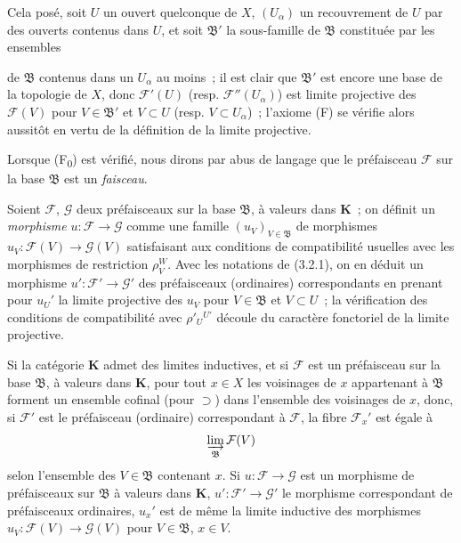 \begin{env}[3.2.2]
Cela posé, soit $U$ un ouvert quelconque de $X$, $(U_\alpha)$ un recouvrement
de $U$ par des ouverts contenus dans $U$, et soit $\mathfrak{B}'$ la
sous-famille de $\mathfrak{B}$ constituée par les ensembles


de $\mathfrak{B}$ contenus dans un $U_\alpha$ au moins~; il est clair que
$\mathfrak{B}'$ est encore une base de la topologie de $X$, donc
$\mathcal{F}'(U)$ (resp. $\mathcal{F}''(U_\alpha)$) est limite projective des
$\mathcal{F}(V)$ pour $V\in\mathfrak{B}'$ et $V\subset U$ (resp.
$V\subset U_\alpha$)~; l'axiome (F) se vérifie alors aussitôt en vertu de la
définition de la limite projective.

Lorsque (F\textsubscript{0}) est vérifié, nous dirons par abus de langage que
le préfaisceau $\mathcal{F}$ sur la base $\mathfrak{B}$ est un \emph{faisceau}.
\end{env}

\begin{env}[3.2.3]
\label{0.3.2.3-fr}
Soient $\mathcal{F}$, $\mathcal{G}$ deux préfaisceaux sur la base
$\mathfrak{B}$, à valeurs dans $\mathbf{K}$~; on définit un \emph{morphisme}
$u:\mathcal{F}\to\mathcal{G}$ comme une famille
$(u_V)_{V\in\mathfrak{B}}$ de morphismes
$u_V:\mathcal{F}(V)\to\mathcal{G}(V)$ satisfaisant aux conditions de
compatibilité usuelles avec les morphismes de restriction $\rho_V^W$. Avec
les notations de (3.2.1), on en déduit un morphisme
$u':\mathcal{F}'\to\mathcal{G}'$ des préfaisceaux (ordinaires) correspondants
en prenant pour $u_U'$ la limite projective des $u_V$ pour
$V\in\mathfrak{B}$ et $V\subset U$~; la vérification des conditions de
compatibilité avec $\rho'_U{}^{U'}$ découle du caractère fonctoriel de la
limite projective.
\end{env}

\begin{env}[3.2.4]
\label{0.3.2.4-fr}
Si la catégorie $\mathbf{K}$ admet des limites inductives, et si $\mathcal{F}$
est un préfaisceau sur la base $\mathfrak{B}$, à valeurs dans $\mathbf{K}$,
pour tout $x\in X$ les voisinages de $x$ appartenant à $\mathfrak{B}$ forment
un ensemble cofinal (pour $\supset$) dans l'ensemble des voisinages de $x$,
donc, si $\mathcal{F}'$ est le préfaisceau (ordinaire) correspondant à
$\mathcal{F}$, la fibre $\mathcal{F}_x'$ est égale à
\[
  \varinjlim_{\mathfrak{B}}\mathcal{F}(V)
\]
selon l'ensemble des $V\in\mathfrak{B}$ contenant $x$.
Si $u:\mathcal{F}\to\mathcal{G}$ est un morphisme de préfaisceaux sur
$\mathfrak{B}$ à valeurs dans $\mathbf{K}$,
$u':\mathcal{F}'\to\mathcal{G}'$ le morphisme correspondant de préfaisceaux
ordinaires, $u_x'$ est de même la limite inductive des morphismes
$u_V:\mathcal{F}(V)\to\mathcal{G}(V)$ pour $V\in\mathfrak{B}$, $x\in V$.
\end{env}

